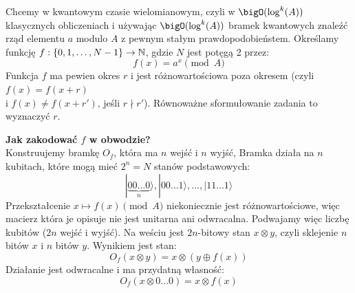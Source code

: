 Chcemy w kwantowym czasie wielomianowym, czyli w \( \bigO(\log^k(A)) \) klasycznych obliczeniach i używając \( \bigO(\log^k(A)) \) bramek kwantowych znaleźć rząd elementu \( a \) modulo \( A \) z pewnym stałym prawdopodobieństem.
Określamy funkcję \( f : \set{0, 1, \ldots, N - 1} \to \natural \), gdzie \( N \) jest potęgą 2 przez:
\[
	f(x) = a^x \pmod{A}
\]
Funkcja \( f \) ma pewien okres \( r \) i jest różnowartościowa poza okresem (czyli \( f(x) = f(x + r) \) \\ i \( f(x) \neq f(x + r') \), jeśli \( r \nmid r' \)).
Równoważne sformułowanie zadania to wyznaczyć \( r \).

\textbf{Jak zakodować \( f \) w obwodzie?} \\
Konstruujemy bramkę \( O_f \), która ma \( n \) wejść i \( n \) wyjść, Bramka działa na \( n \) kubitach, które mogą mieć \( 2^n = N \) stanów podstawowych:
\[
	|\underbrace{00\ldots0}_n\rangle, |00\ldots1\rangle, \ldots, |11\ldots1\rangle
\]
Przekształcenie \( x \mapsto f(x) \pmod{A} \) niekoniecznie jest różnowartościowe, więc macierz która je opisuje nie jest unitarna ani odwracalna.
Podwajamy więc liczbę kubitów (\( 2n \) wejść i wyjść). Na weściu jest \( 2n \)-bitowy stan \( x \otimes y \), czyli sklejenie \( n \) bitów \( x \) i \( n \) bitów \( y \).
Wynikiem jest stan:
\[
	O_f(x \otimes y) = x \otimes (y \oplus f(x))
\]
Działanie jest odwracalne i ma przydatną własność:
\[
	O_f(x \otimes 0\ldots0) = x \otimes f(x)
\]

